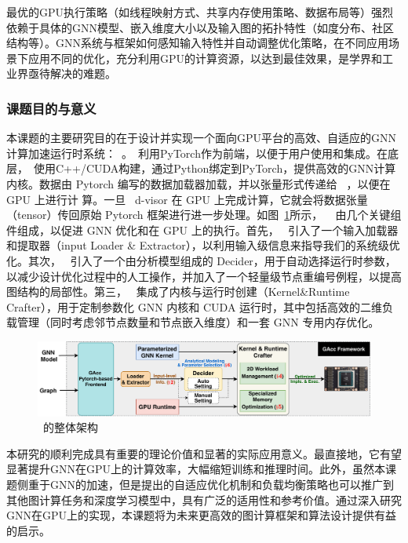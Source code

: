 最优的GPU执行策略（如线程映射方式、共享内存使用策略、数据布局等）强烈依赖于具体的GNN模型、嵌入维度大小以及输入图的拓扑特性（如度分布、社区结构等）。GNN系统与框架如何感知输入特性并自动调整优化策略，在不同应用场景下应用不同的优化，充分利用GPU的计算资源，以达到最佳效果，是学界和工业界亟待解决的难题。

\subsubsection{课题目的与意义}
本课题的主要研究目的在于设计并实现一个面向GPU平台的高效、自适应的GNN计算加速运行时系统：~\Mname{}。~\Mname{}利用PyTorch作为前端，以便于用户使用和集成。在底层，~\Mname{}使用C++/CUDA构建，通过Python绑定到PyTorch，提供高效的GNN计算内核。数据由 Pytorch 编写的数据加载器加载，并以张量形式传递给 ~\Mname{}，以便在 GPU 上进行计 算。一旦 ~\Mname{}d-visor 在 GPU 上完成计算，它就会将数据张量（tensor）传回原始 Pytorch 框架进行进一步处理。如图~\ref{fig: Overview}所示， ~\Mname{} 由几个关键组件组成，以促进 GNN 优化和在 GPU 上的执行。首先，~\Mname{} 引入了一个输入加载器和提取器（input Loader \& Extractor），以利用输入级信息来指导我们的系统级优化。其次，~\Mname{} 引入了一个由分析模型组成的 Decider，用于自动选择运行时参数，以减少设计优化过程中的人工操作，并加入了一个轻量级节点重编号例程，以提高图结构的局部性。第三，~\Mname{} 集成了内核与运行时创建（Kernel\&Runtime Crafter），用于定制参数化 GNN 内核和 CUDA 运行时，其中包括高效的二维负载管理（同时考虑邻节点数量和节点嵌入维度）和一套 GNN 专用内存优化。

 
\begin{figure}[htbp] 
    \centering
    \includegraphics[width=\linewidth]{images/Overall-Arch-1.pdf}
    \caption{~\Mname{}的整体架构}
    \label{fig: Overview}
\end{figure}

本研究的顺利完成具有重要的理论价值和显著的实际应用意义。最直接地，它有望显著提升GNN在GPU上的计算效率，大幅缩短训练和推理时间。此外，虽然本课题侧重于GNN的加速，但是提出的自适应优化机制和负载均衡策略也可以推广到其他图计算任务和深度学习模型中，具有广泛的适用性和参考价值。通过深入研究GNN在GPU上的实现，本课题将为未来更高效的图计算框架和算法设计提供有益的启示。


